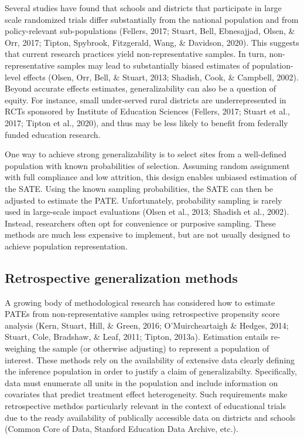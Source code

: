 \documentclass[english,man,floatsintext]{apa6}
\begin{document}
Several studies have found that schools and districts that participate in large scale randomized trials differ substantially from the national population and from policy-relevant sub-populations (Fellers, 2017; Stuart, Bell, Ebnesajjad, Olsen, \& Orr, 2017; Tipton, Spybrook, Fitzgerald, Wang, \& Davidson, 2020). This suggests that current research practices yield non-representative samples. In turn, non-representative samples may lead to substantially biased estimates of population-level effects (Olsen, Orr, Bell, \& Stuart, 2013; Shadish, Cook, \& Campbell, 2002). Beyond accurate effects estimates, generalizability can also be a question of equity. For instance, small under-served rural districts are underrepresented in RCTs sponsored by Institute of Education Sciences (Fellers, 2017; Stuart et al., 2017; Tipton et al., 2020), and thus may be less likely to benefit from federally funded education research.

One way to achieve strong generalizability is to select sites from a well-defined population with known probabilities of selection. Assuming random assignment with full compliance and low attrition, this design enables unbiased estimation of the SATE. Using the known sampling probabilities, the SATE can then be adjusted to estimate the PATE. Unfortunately, probability sampling is rarely used in large-scale impact evaluations (Olsen et al., 2013; Shadish et al., 2002). Instead, researchers often opt for convenience or purposive sampling. These methods are much less expensive to implement, but are not usually designed to achieve population representation.

\hypertarget{retrospective-generalization-methods}{%
\subsection{Retrospective generalization methods}\label{retrospective-generalization-methods}}

A growing body of methodological research has considered how to estimate PATEs from non-representative samples using retrospective propensity score analysis (Kern, Stuart, Hill, \& Green, 2016; O'Muircheartaigh \& Hedges, 2014; Stuart, Cole, Bradshaw, \& Leaf, 2011; Tipton, 2013a). Estimation entails re-weighing the sample (or otherwise adjusting) to represent a population of interest.
These methods rely on the availability of extensive data clearly defining the inference population in order to justify a claim of generalizabilty. Specifically, data must enumerate all units in the population and include information on covariates that predict treatment effect heterogeneity. Such requirements make retrospective methdos particularly relevant in the context of educational trials due to the ready availability of publically accessible data on districts and schools (Common Core of Data, Stanford Education Data Archive, etc.).
\end{document}
